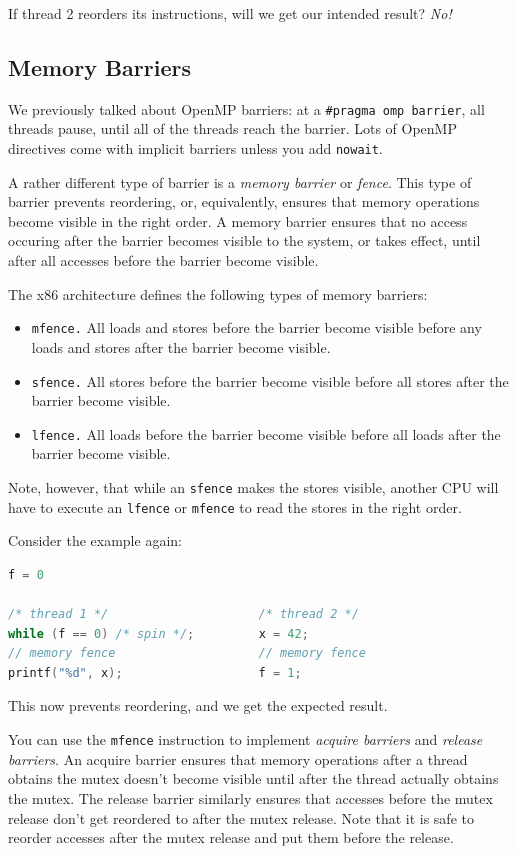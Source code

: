 \documentclass[a4paper]{report}
\begin{document}
If thread 2 reorders its instructions, will we get our intended
result? \emph{No!}

\subsection*{Memory Barriers} We previously talked about OpenMP barriers: 
at a {\tt \#pragma omp barrier}, all threads pause, until all of the
threads reach the barrier. Lots of OpenMP directives come with implicit barriers
unless you add {\tt nowait}.

A rather different type of barrier is a \emph{memory barrier} or
\emph{fence}. This type of barrier prevents reordering, or,
equivalently, ensures that memory operations become visible in the
right order. A memory barrier ensures that no access occuring after
the barrier becomes visible to the system, or takes effect, until
after all accesses before the barrier become visible.


The x86 architecture defines the following types of memory 
barriers:

\begin{itemize}
\item {\tt mfence.} All loads and stores before the barrier become
visible before any loads and stores after the barrier become visible.
\item {\tt sfence.} All stores before the barrier become visible before
all stores after the barrier become visible.
\item {\tt lfence.} All loads before the barrier become visible before
all loads after the barrier become visible.
\end{itemize}

Note, however, that while an {\tt sfence} makes the stores visible,
another CPU will have to execute an {\tt lfence} or {\tt mfence} to
read the stores in the right order.

\pagebreak
Consider the example again:
  \begin{lstlisting}[language=C]
                         f = 0

/* thread 1 */                     /* thread 2 */
while (f == 0) /* spin */;         x = 42;
// memory fence                    // memory fence
printf("%d", x);                   f = 1;
  \end{lstlisting}
This now prevents reordering, and we get the expected result.

You can use the {\tt mfence} instruction to implement \emph{acquire
  barriers} and \emph{release barriers}.  An acquire barrier ensures
that memory operations after a thread obtains the mutex doesn't become
visible until after the thread actually obtains the mutex.
The release barrier similarly ensures that accesses before the mutex
release don't get reordered to after the mutex release. Note that
it is safe to reorder accesses after the mutex release and put them
before the release.
\end{document}
